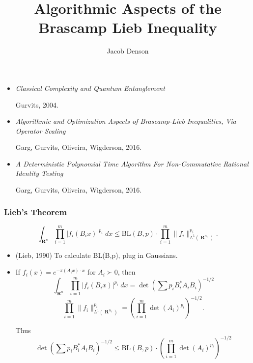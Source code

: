 \documentclass[usenames,dvipsnames,12pt]{beamer}
\title{Algorithmic Aspects of the Brascamp Lieb Inequality}
\author{Jacob Denson}
\institute{University of Wisconsin Madison}
\DeclareMathOperator{\RR}{\mathbf{R}}
\begin{document}
\maketitle

\begin{frame}

\begin{itemize}
    \item \emph{Classical Complexity and Quantum Entanglement}

    Gurvits, 2004.
    \item \emph{Algorithmic and Optimization Aspects of Brascamp-Lieb Inequalities, Via Operator Scaling}

    Garg, Gurvits, Oliveira, Wigderson, 2016.
    \item \emph{A Deterministic Polynomial Time Algorithm For Non-Commutative Rational Identity Testing}

    Garg, Gurvits, Oliveira, Wigderson, 2016.
\end{itemize}

\end{frame}

\begin{frame}
    \frametitle{Lieb's Theorem}

    \vspace{-0.5em}
    \[ \int_{\RR^n} \prod_{i = 1}^m |f_i(B_i x)|^{p_i}\; dx \leq \text{BL}(B,p) \cdot \prod_{i=1}^m \| f_i \|_{L^1(\RR^{n_i})}^{p_i}.  \]

    \begin{itemize}
        \pause
        \item (Lieb, 1990) To calculate BL(B,p), plug in Gaussians.

        \pause
        \item If $f_i(x) = e^{- \pi (A_i x) \cdot x}$ for $A_i \succ 0$, then
        \pause
        \[ \int_{\RR^n} \prod_{i = 1}^m |f_i(B_i x)|^{p_i}\; dx = \det(\sum p_i B_i^* A_i B_i)^{-1/2} \]
        \pause
        \[ \prod_{i = 1}^m \| f_i \|_{L^1(\RR^{n_i})}^{p_i} = (\prod_{i = 1}^m \det(A_i)^{p_i})^{-1/2}. \]

        \pause
        Thus
        \[ \det(\sum p_i B_i^* A_i B_i)^{-1/2} \leq \text{BL}(B,p) \cdot (\prod_{i = 1}^m \det(A_i)^{p_i})^{-1/2} \]

    \end{itemize}
\end{frame}
\end{document}
